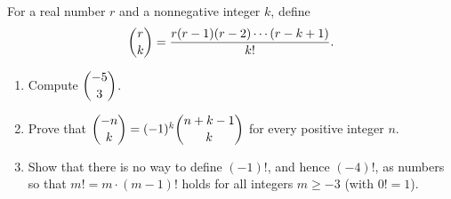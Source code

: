 For a real number $r$ and a nonnegative integer $k$, define
\[
\dbinom{r}{k}=\dfrac{r(r-1)(r-2)\cdots(r-k+1)}{k!}.
\]
\begin{enumerate}
\item[(a)] Compute $\dbinom{-5}{3}$.
\item[(b)] Prove that $\dbinom{-n}{k}=(-1)^k\dbinom{n+k-1}{k}$ for every positive integer $n$.
\item[(c)] Show that there is no way to define $(-1)!$, and hence $(-4)!$, as numbers so that $m!=m\cdot(m-1)!$ holds for all integers $m\ge -3$ (with $0!=1$).
\end{enumerate}
